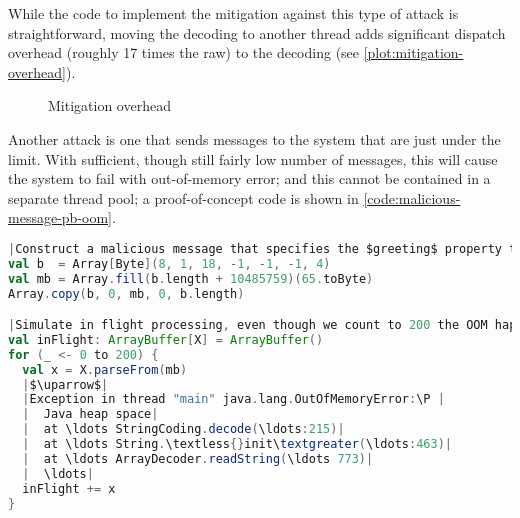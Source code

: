 While the code to implement the mitigation against this type of attack is straightforward, moving the decoding to another thread adds significant dispatch overhead (roughly 17 times the raw) to the decoding (see \autoref{plot:mitigation-overhead}). 

\begin{figure}[h]
  \caption{Mitigation overhead}
  \label{plot:mitigation-overhead}
\end{figure}

Another attack is one that sends messages to the system that are just under the  limit. With sufficient, though still fairly low number of messages, this will cause the system to fail with out-of-memory error; and this cannot be contained in a separate thread pool; a proof-of-concept code is shown in \autoref{code:malicious-message-pb-oom}.

\begin{lstlisting}[caption={Malicious message}, label={code:malicious-message-pb-oom}, language=Scala, escapechar=|]
|Construct a malicious message that specifies the $greeting$ property to be a string of $10485759$ characters. The eager parser makes a copy of the entire buffer, the streaming parser reads \& allocates the memory by chunks.|
val b  = Array[Byte](8, 1, 18, -1, -1, -1, 4)
val mb = Array.fill(b.length + 10485759)(65.toByte)
Array.copy(b, 0, mb, 0, b.length)

|Simulate in flight processing, even though we count to 200 the OOM happens around 165|
val inFlight: ArrayBuffer[X] = ArrayBuffer()
for (_ <- 0 to 200) {
  val x = X.parseFrom(mb)
  |$\uparrow$|
  |Exception in thread "main" java.lang.OutOfMemoryError:\P |
  |  Java heap space|
  |  at \ldots StringCoding.decode(\ldots:215)|
  |  at \ldots String.\textless{}init\textgreater(\ldots:463)|
  |  at \ldots ArrayDecoder.readString(\ldots 773)|
  |  \ldots|
  inFlight += x
}
\end{lstlisting}

